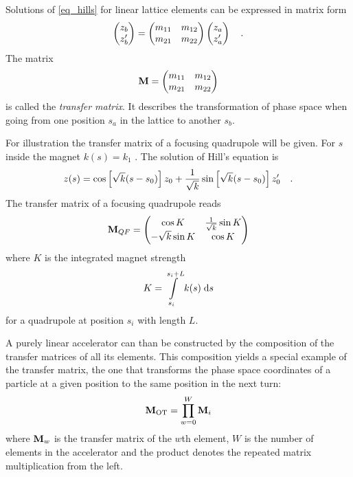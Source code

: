 Solutions of \eqref{eq_hills} for linear lattice elements can be expressed in matrix form
%
\begin{equation}
    \begin{pmatrix}
        z_b\\
        z_b'
    \end{pmatrix}
    =
    \begin{pmatrix}
        m_{11} & m_{12} \\
        m_{21} & m_{22}
    \end{pmatrix}
    \begin{pmatrix}
        z_a\\
        z_a'
    \end{pmatrix}
    \quad .
    \label{eq_matrix_element}
\end{equation}
%
The matrix 
%
\begin{equation}
    \mathbf{M} = 
    \begin{pmatrix}
        m_{11} & m_{12} \\
        m_{21} & m_{22}
    \end{pmatrix}
    \label{eq_trmat}
\end{equation}
%
is called the \emph{transfer matrix}. It describes the transformation
of phase space when going from one position $s_a$ in the lattice to another $s_b$.

For illustration the transfer matrix of a focusing quadrupole will be given.
For $s$ inside the magnet $k(s) = k_1$ . The solution of Hill's equation is
%
\begin{equation}
    z(s) = \cos \left[ \sqrt{k}(s-s_0)\right] z_0 + \frac{1}{\sqrt{k}}\sin\left[\sqrt{k}(s-s_0)\right]z_0'
    \quad .
\end{equation}
%
The transfer matrix of a focusing quadrupole reads
%
\begin{equation}
    \mathbf{M}_{QF} =
    \begin{pmatrix}
        \cos K & \frac{1}{\sqrt{k}} \sin K \\
        -\sqrt{k}\sin K & \cos K
    \end{pmatrix}
\end{equation}
%
where $K$ is the integrated magnet strength
%
\begin{equation}
    K = \int\limits_{s_i}^{s_i + L} k(s)\;\text{d} s
\end{equation}
%
for a quadrupole at position $s_i$ with length $L$.

A purely linear accelerator can than be constructed by the composition of the transfer matrices of 
all its elements. This composition yields a special example of the transfer matrix, the one that
transforms the phase space coordinates of a particle at a given position to the same position in the
next turn:
%
\begin{equation}
    \mathbf{M}_\text{OT} = \prod\limits_{w=0}^W \mathbf{M}_i
\end{equation}
%
where $\mathbf{M}_w$ is the transfer matrix of the $w$th element, $W$ is the number of elements in the
accelerator and the product denotes the repeated matrix multiplication from the left.

